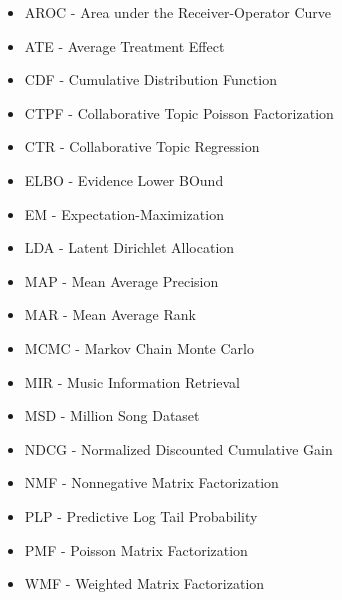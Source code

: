 \begin{itemize}
\item AROC - Area under the Receiver-Operator Curve

\item ATE - Average Treatment Effect

\item CDF - Cumulative Distribution Function

\item CTPF - Collaborative Topic Poisson Factorization

\item CTR - Collaborative Topic Regression

\item ELBO - Evidence Lower BOund

\item EM - Expectation-Maximization

\item LDA - Latent Dirichlet Allocation

\item MAP - Mean Average Precision

\item MAR - Mean Average Rank

\item MCMC - Markov Chain Monte Carlo

\item MIR - Music Information Retrieval

\item MSD - Million Song Dataset

\item NDCG - Normalized Discounted Cumulative Gain

\item NMF - Nonnegative Matrix Factorization

\item PLP - Predictive Log Tail Probability

\item PMF - Poisson Matrix Factorization

\item WMF - Weighted Matrix Factorization
\end{itemize}


